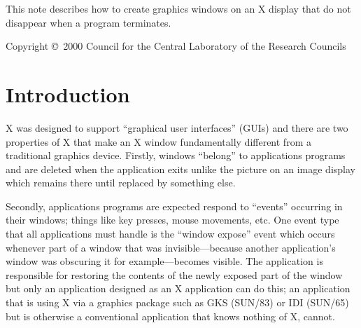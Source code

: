 \documentclass[twoside,11pt]{article}
\newcommand{\stardocinitials}  {SUN}
\newcommand{\stardoccopyright}
{Copyright \copyright\ 2000 Council for the Central Laboratory of the Research Councils}
\newcommand{\stardocnumber}    {130.5}
\newcommand{\stardocabstract}  {This note describes how to create graphics
windows on an X display that do not disappear when a program terminates.}
\newcommand{\stardocname}{\stardocinitials /\stardocnumber}
\newenvironment{latexonly}{}{}
\newcommand{\xref}[3]{#1}
\renewcommand{\_}{\texttt{\symbol{95}}}
\renewcommand{\thepage}{\roman{page}}
\begin{document}
\stardocabstract

\begin{latexonly}
\newpage
\vspace*{\fill}
\stardoccopyright
\end{latexonly}

  \newpage
  \begin{latexonly}
    \setlength{\parskip}{0mm}
    \tableofcontents
    \setlength{\parskip}{\medskipamount}
    \markboth{\stardocname}{\stardocname}
  \end{latexonly}

\cleardoublepage
\renewcommand{\thepage}{\arabic{page}}
\setcounter{page}{1}

\section{Introduction}

X was designed to support ``graphical user interfaces'' (GUIs) and there are two
properties of X that make an X window fundamentally different from a
traditional graphics device.
Firstly, windows ``belong'' to applications programs and are deleted when the
application exits unlike the picture on an image display which remains there
until replaced by something else.

Secondly, applications
programs are expected respond to ``events'' occurring in their windows;
things like key presses, mouse movements, etc. One event type that all
applications must handle is the ``window expose'' event which occurs whenever
part of a window that was invisible---because another application's window was
obscuring it for example---becomes visible. The application is responsible for
restoring the contents of the newly exposed part of the window but only an
application designed as an X application can do this; an application that is
using X via a graphics package such as GKS (\xref{SUN/83}{sun83}{})
or IDI (\xref{SUN/65}{sun65}{}) but is otherwise a
conventional application that knows nothing of X, cannot.
\end{document}
